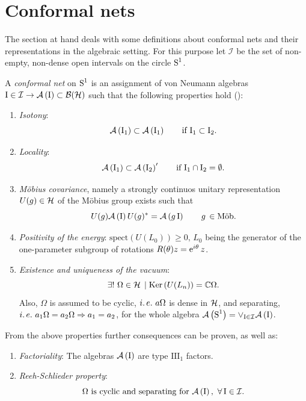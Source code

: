 \section{Conformal nets}
\label{Conformal nets}
The section at hand deals with some definitions about conformal nets
and their representations in the algebraic setting. For this purpose
let $\mathcal{I}$ be the set of non-empty, non-dense open intervals
on the circle $\textrm{S}^1$.
\begin{definition}
A \emph{conformal net} on $\textrm{S}^1$ is an assignment of von Neumann algebras
$\textrm{I}\in \mathcal{I}\to\mathcal{A}\left(\textrm{I}\right)\subset\mathcal{B}(\mathcal{H})$ such that the following 
properties hold (\cite*{Ca2004}):
  \begin{enumerate}
   \item \emph{Isotony}:
         \[
         \mathcal{A}\left(\textrm{I}_1\right)\subset\mathcal{A}\left(\textrm{I}_1\right)\qquad
         \text{if } \textrm{I}_1\subset\textrm{I}_2.
         \]
   \item \emph{Locality}:
         \[
         \mathcal{A}\left(\textrm{I}_1\right)\subset\mathcal{A}\left(\textrm{I}_2\right)'\qquad
         \text{if } \textrm{I}_1\cap\textrm{I}_2=\emptyset.
         \]
   \item \emph{M\"obius covariance}, namely a strongly continuos unitary 
         representation $U(g)\in\mathcal{H}$ of the M\"obius group  
         exists such that 
         \[
         U(g)\mathcal{A}\left(\textrm{I}\right)U(g)^*=\mathcal{A}\left(g\,\textrm{I}\right)\qquad g\,\in \text{M\"ob}.
         \]
   \item \emph{Positivity of the energy}: $\textrm{spect}\left(U(L_0)\right)
         \geq 0,\,L_0$ being the generator of the one-parameter
         subgroup of rotations $R(\theta)z=\operatorname{e}^{i\theta}z$.
   \item \emph{Existence and uniqueness of the vacuum}:
         \[
         \exists !\ \Omega\in\mathcal{H}\,\mid
         \textrm{Ker}\left(U(L_n)\right)=\mathbb{C}\Omega.
         \]
         Also, $\Omega$ is assumed to be cyclic, $i.\,e.\ a\Omega$ 
         is dense in $\mathcal{H}$, and separating, $i.\,e.\
         a_1\Omega=a_2\Omega\Rightarrow a_1=a_2$,
         for the whole algebra $\mathcal{A}\left(\textrm{S}^1\right)=\vee_{\textrm{I} \in\mathcal{I}}
         \mathcal{A}\left(\textrm{I}\right)$.           
   \end{enumerate}
From the above properties further consequences can be proven, as 
well as:
  \begin{enumerate}[resume]
   \item \emph{Factoriality}: The algebras $\mathcal{A}\left(\textrm{I}\right)$ are 
         type $\textrm{III}_1$ factors.
   \item \emph{Reeh-Schlieder property}: 
         \[
         \Omega \text{ is cyclic and separating for } 
         \mathcal{A}\left(\textrm{I}\right),\ \forall\,\textrm{I}\in\mathcal{I}.
\]
\end{enumerate}
\end{definition}
